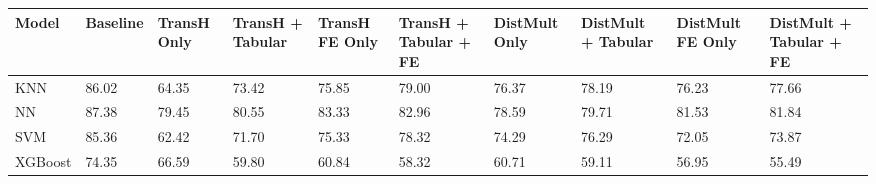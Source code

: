 \begin{tabular}{llllllllll}
\toprule
Model & Baseline & TransH Only & TransH + Tabular & TransH FE Only & TransH + Tabular + FE & DistMult Only & DistMult + Tabular & DistMult FE Only & DistMult + Tabular + FE \\
\midrule
KNN & 86.02 & 64.35 & 73.42 & 75.85 & 79.00 & 76.37 & 78.19 & 76.23 & 77.66 \\
NN & 87.38 & 79.45 & 80.55 & 83.33 & 82.96 & 78.59 & 79.71 & 81.53 & 81.84 \\
SVM & 85.36 & 62.42 & 71.70 & 75.33 & 78.32 & 74.29 & 76.29 & 72.05 & 73.87 \\
XGBoost & 74.35 & 66.59 & 59.80 & 60.84 & 58.32 & 60.71 & 59.11 & 56.95 & 55.49 \\
\bottomrule
\end{tabular}
